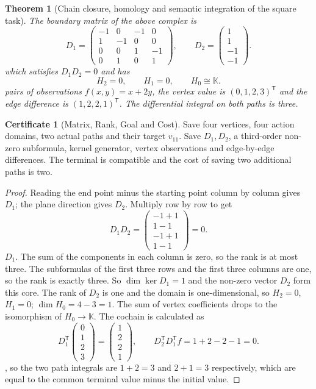 \documentclass[12pt,a4paper,openany,notitlepage]{report}
\theoremstyle{plain}
\newtheorem{theorem}{Theorem}[chapter]
\theoremstyle{definition}
\newtheorem*{certificate}{Certificate}
\theoremstyle{remark}
\begin{document}
\begin{CJK*}
\begin{theorem}
[Chain closure, homology and semantic integration of the square task]\label{exp:task:square-homology}
The boundary matrix of the above complex is \[
 D_1=\begin{pmatrix}
 -1&0&-1&0\\1&-1&0&0\\0&0&1&-1\\0&1&0&1
 \end{pmatrix},\qquad
 D_2=\begin{pmatrix}1\\1\\-1\\-1\end{pmatrix}.
\] which satisfies $D_1D_2=0$ and has \[
 H_2=0,\qquad H_1=0,\qquad H_0\cong\mathbb K.
\] pairs of observations $f(x,y)=x+2y$, the vertex value is $(0,1,2,3)^{\mathsf T}$ and the edge difference is $(1,2,2,1)^{\mathsf T}$. The differential integral on both paths is three.\end{theorem}
\begin{certificate}
[Matrix, Rank, Goal and Cost]Save four vertices, four action domains, two actual paths and their target $v_{11}$. Save $D_1,D_2$, a third-order non-zero subformula, kernel generator, vertex observations and edge-by-edge differences. The terminal is compatible and the cost of saving two additional paths is two.\end{certificate}
\begin{proof}
Reading the end point minus the starting point column by column gives $D_1$; the plane direction gives $D_2$. Multiply row by row to get \[
 D_1D_2=\begin{pmatrix}-1+1\\1-1\\-1+1\\1-1\end{pmatrix}=0.
\] $D_1$. The sum of the components in each column is zero, so the rank is at most three. The subformulas of the first three rows and the first three columns are one, so the rank is exactly three. So $\dim\ker D_1=1$ and the non-zero vector $D_2$ form this core. The rank of $D_2$ is one and the domain is one-dimensional, so $H_2=0$, $H_1=0$; $\dim H_0=4-3=1$. The sum of vertex coefficients drops to the isomorphism of $H_0\to\mathbb K$. The cochain is calculated as \[
 D_1^{\mathsf T}\begin{pmatrix}0\\1\\2\\3\end{pmatrix}
 =\begin{pmatrix}1\\2\\2\\1\end{pmatrix},\qquad
 D_2^{\mathsf T}D_1^{\mathsf T}f=1+2-2-1=0.
\], so the two path integrals are $1+2=3$ and $2+1=3$ respectively, which are equal to the common terminal value minus the initial value.\end{proof}



\end{CJK*}
\end{document}
